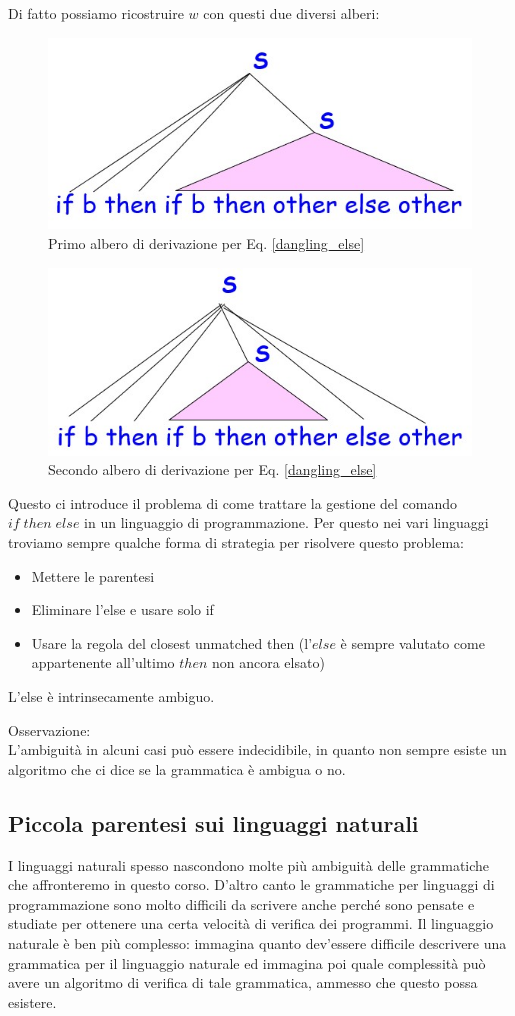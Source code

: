 \documentclass[class=book, crop=false, oneside, 12pt]{standalone}
\begin{document}
Di fatto possiamo ricostruire \(w\) con questi due diversi alberi:
\begin{figure}
	\centering
    \includegraphics[width=.7\textwidth,keepaspectratio]{dangling_else_1.jpg}
    \caption{Primo albero di derivazione per Eq. \ref{dangling_else}}
    \label{dangling_else_1}
\end{figure}
\begin{figure}
	\centering
    \includegraphics[width=.7\textwidth,keepaspectratio]{dangling_else_2.jpg}
    \caption{Secondo albero di derivazione per Eq. \ref{dangling_else}}
    \label{dangling_else_2}
\end{figure}
Questo ci introduce il problema di come trattare la gestione del comando \(if \; then \; else\) in un linguaggio di programmazione.
Per questo nei vari linguaggi troviamo sempre qualche forma di strategia per risolvere questo problema:
\begin{itemize}
    \item Mettere le parentesi
    \item Eliminare l’else e usare solo if
    \item Usare la regola del closest unmatched then (l’\(else\) è sempre valutato come appartenente all’ultimo \(then\) non ancora elsato)
\end{itemize}
L’else è intrinsecamente ambiguo.

Osservazione:\\
L’ambiguità in alcuni casi può essere indecidibile, in quanto non sempre esiste un algoritmo che ci dice se la grammatica è ambigua o no.

\subsection{Piccola parentesi sui linguaggi naturali}
I linguaggi naturali spesso nascondono molte più ambiguità delle grammatiche che affronteremo in questo corso.
D'altro canto le grammatiche per linguaggi di programmazione sono molto difficili da scrivere anche perché sono pensate e studiate per ottenere una certa velocità di verifica dei programmi.
Il linguaggio naturale è ben più complesso: immagina quanto dev’essere difficile descrivere una grammatica per il linguaggio naturale ed immagina poi quale complessità può avere un algoritmo di verifica di tale grammatica, ammesso che questo possa esistere.
\end{document}
